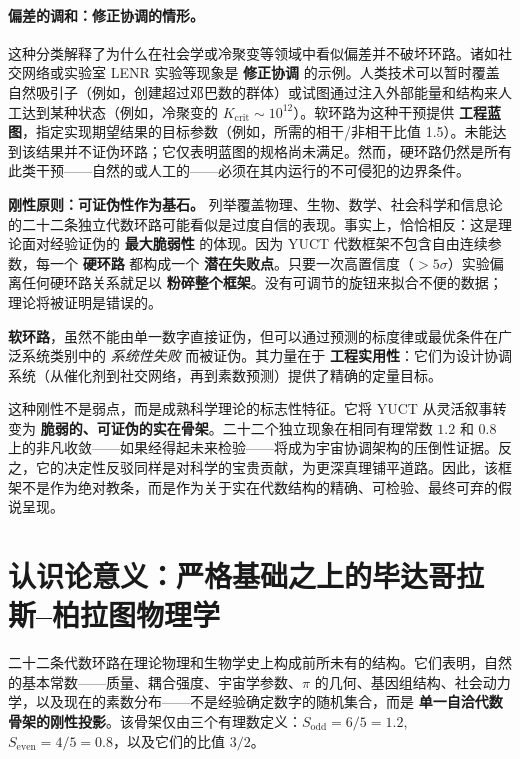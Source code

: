 \documentclass[12pt,a4paper]{article}
\begin{document}
	\paragraph{偏差的调和：修正协调的情形。}
	这种分类解释了为什么在社会学或冷聚变等领域中看似偏差并不破坏环路。诸如社交网络或实验室 LENR 实验等现象是 \textbf{修正协调} 的示例。人类技术可以暂时覆盖自然吸引子（例如，创建超过邓巴数的群体）或试图通过注入外部能量和结构来人工达到某种状态（例如，冷聚变的 \(K_{\mathrm{crit}} \sim 10^{12}\)）。软环路为这种干预提供 \textbf{工程蓝图}，指定实现期望结果的目标参数（例如，所需的相干/非相干比值 1.5）。未能达到该结果并不证伪环路；它仅表明蓝图的规格尚未满足。然而，硬环路仍然是所有此类干预——自然的或人工的——必须在其内运行的不可侵犯的边界条件。
	
	\vspace{0.5cm}
	\noindent
	\textbf{刚性原则：可证伪性作为基石。}
	列举覆盖物理、生物、数学、社会科学和信息论的二十二条独立代数环路可能看似是过度自信的表现。事实上，恰恰相反：这是理论面对经验证伪的 \textbf{最大脆弱性} 的体现。因为 YUCT 代数框架不包含自由连续参数，每一个 \textbf{硬环路} 都构成一个 \textbf{潜在失败点}。只要一次高置信度（\(>5\sigma\)）实验偏离任何硬环路关系就足以 \textbf{粉碎整个框架}。没有可调节的旋钮来拟合不便的数据；理论将被证明是错误的。
	
	\textbf{软环路}，虽然不能由单一数字直接证伪，但可以通过预测的标度律或最优条件在广泛系统类别中的 \textit{系统性失败} 而被证伪。其力量在于 \textbf{工程实用性}：它们为设计协调系统（从催化剂到社交网络，再到素数预测）提供了精确的定量目标。
	
	这种刚性不是弱点，而是成熟科学理论的标志性特征。它将 YUCT 从灵活叙事转变为 \textbf{脆弱的、可证伪的实在骨架}。二十二个独立现象在相同有理常数 \(1.2\) 和 \(0.8\) 上的非凡收敛——如果经得起未来检验——将成为宇宙协调架构的压倒性证据。反之，它的决定性反驳同样是对科学的宝贵贡献，为更深真理铺平道路。因此，该框架不是作为绝对教条，而是作为关于实在代数结构的精确、可检验、最终可弃的假说呈现。
	
	\section*{认识论意义：严格基础之上的毕达哥拉斯–柏拉图物理学}
	
	二十二条代数环路在理论物理和生物学史上构成前所未有的结构。它们表明，自然的基本常数——质量、耦合强度、宇宙学参数、\(\pi\) 的几何、基因组结构、社会动力学，以及现在的素数分布——不是经验确定数字的随机集合，而是 \textbf{单一自洽代数骨架的刚性投影}。该骨架仅由三个有理数定义：\(S_{\mathrm{odd}} = 6/5 = 1.2\), \(S_{\mathrm{even}} = 4/5 = 0.8\)，以及它们的比值 \(3/2\)。
	
\end{document}
